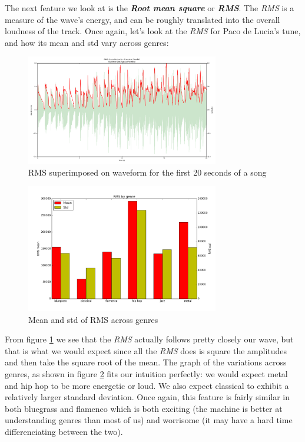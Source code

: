 \documentclass[12pt]{article}
\begin{document}
The next feature we look at is the \textbf{\textit{Root mean square}} or \textbf{\textit{RMS}}. The \textit{RMS} is a measure of the wave's energy, and can be roughly translated into the overall loudness of the track. Once again, let's look at the \textit{RMS} for Paco de Lucia's tune, and how its mean and std vary across genres:
\medskip

\begin{figure}
\centering
  \includegraphics[width=0.75\textwidth]{RMS_Entre_Dos_Aguas.png}
  \caption{RMS superimposed on waveform for the first 20 seconds of a song}
  \label{rms}
\end{figure}

\medskip

\begin{figure}
\centering
  \includegraphics[width=0.75\textwidth]{RMS_by_genre.png}
  \caption{Mean and std of RMS across genres}
  \label{rms_genres}
\end{figure}

\medskip

From figure \ref{rms} we see that the \textit{RMS} actually follows pretty closely our wave, but that is what we would expect since all the \textit{RMS} does is square the amplitudes and then take the square root of the mean. The graph of the variations across genres, as shown in figure \ref{rms_genres} fits our intuition perfectly: we would expect metal and hip hop to be more energetic or loud. We also expect classical to exhibit a relatively larger standard deviation. Once again, this feature is fairly similar in both bluegrass and flamenco which is both exciting (the machine is better at understanding genres than most of us) and worrisome (it may have a hard time differenciating between the two).
\medskip
\end{document}
